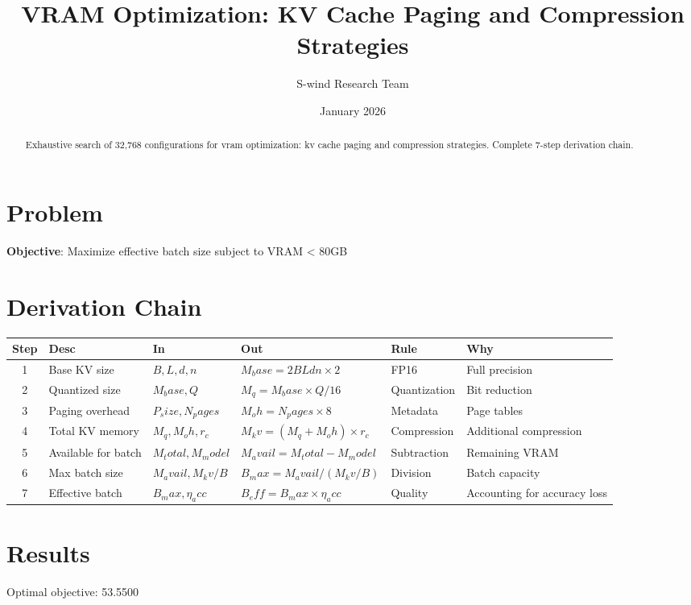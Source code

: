 \documentclass[11pt]{article}
\title{VRAM Optimization: KV Cache Paging and Compression Strategies}
\author{S-wind Research Team}
\date{January 2026}
\begin{document}
\maketitle

\begin{abstract}
Exhaustive search of 32,768 configurations for vram optimization: kv cache paging and compression strategies. Complete 7-step derivation chain.
\end{abstract}

\section{Problem}
\textbf{Objective}: Maximize effective batch size subject to VRAM < 80GB

\section{Derivation Chain}
\begin{longtable}{|c|p{2cm}|p{2cm}|p{3cm}|p{2cm}|p{3cm}|}
\hline
Step & Desc & In & Out & Rule & Why\\\hline\endhead
1 & Base KV size & $B, L, d, n$ & $M_base = 2BLdn×2$ & FP16 & Full precision\\\hline
2 & Quantized size & $M_base, Q$ & $M_q = M_base×Q/16$ & Quantization & Bit reduction\\\hline
3 & Paging overhead & $P_size, N_pages$ & $M_oh = N_pages×8$ & Metadata & Page tables\\\hline
4 & Total KV memory & $M_q, M_oh, r_c$ & $M_kv = (M_q + M_oh)×r_c$ & Compression & Additional compression\\\hline
5 & Available for batch & $M_total, M_model$ & $M_avail = M_total - M_model$ & Subtraction & Remaining VRAM\\\hline
6 & Max batch size & $M_avail, M_kv/B$ & $B_max = M_avail/(M_kv/B)$ & Division & Batch capacity\\\hline
7 & Effective batch & $B_max, η_acc$ & $B_eff = B_max × η_acc$ & Quality & Accounting for accuracy loss\\\hline
\end{longtable}

\section{Results}
Optimal objective: 53.5500
\end{document}
